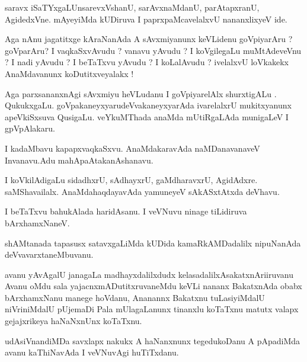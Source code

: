 \documentclass{article}
\begin{document}
\begin{mn}%
saravx iSaTYxgaLUnsarevxVshanU, sarAvxnaMdanU, parAtapxranU, AgidedxVne. mAyeyiMda 
kUDiruva I paprxpaMcavelalxvU nananxlixyeV ide.
\end{mn}

\begin{mn}%
Aga nAnu jagatitxge kAraNanAda A sAvxmiyanunx keVLidenu goVpiyarAru ? goVparAru? I 
vaqkaSxvAvudu ? vanavu yAvudu ? I koVgilegaLu muMtAdeveVnu ? I nadi yAvudu ? I beTaTxvu 
yAvudu ? I koLalAvudu ? ivelalxvU loVkakekx AnaMdavanunx koDutitxveyalakx !
\end{mn}

\begin{mn}%
Aga parxsananxnAgi sAvxmiyu heVLudanu I goVpiyarelAlx shurxtigALu . QukukxgaLu. 
goVpakaneyxyarudeVvakaneyxyarAda ivarelalxrU mukitxyanunx apeVkiSxsuva QusigaLu. 
veYkuMThada anaMda mUtiRgaLAda munigaLeV I gpVpAlakaru.
\end{mn}

\begin{mn}%
I kadaMbavu kapapxvaqkaSxvu. AnaMdakaravAda naMDanavanaveV Invanavu.Adu mahApaAtakanAshanavu.
\end{mn}

\begin{mn}%
I koVkilAdigaLu sidadhxrU, sAdhayxrU, gaMdharavxrU, AgidAdxre. saMShavailalx. 
AnaMdahaqdayavAda yamuneyeV sAkASxtAtxda deVhavu.
\end{mn}

\begin{mn}%
I beTaTxvu bahukAlada haridAsanu. I veVNuvu ninage tiLidiruva bArxhamxNaneV.
\end{mn}

\begin{mn}%
shAMtanada tapasusx satavxgaLiMda kUDida kamaRkAMDadalilx nipuNanAda deVvavarxtaneMbuvanu.
\end{mn}

\begin{mn}%
avanu yAvAgalU janagaLa madhayxdalilxdudx kelasadalilxAsakatxnAriiruvanu Avanu oMdu sala
yajacnxmADutitxruvaneMdu keVLi nananx BakatxnAda obabx bArxhamxNanu manege hoVdanu, 
Ananannx Bakatxnu tuLasiyiMdalU niVriniMdalU pUjemaDi Pala mUlagaLanunx tinanxlu koTaTxnu 
matutx valapx gejajxrikeya haNaNxnUnx koTaTxnu.
\end{mn}

\begin{mn}%
udAsiVnandiMDa savxlapx nakukx A haNanxnunx tegedukoDanu A pApadiMda avanu kaThiNavAda I 
veVNuvAgi huTiTxdanu.
\end{mn}
\end{document}
